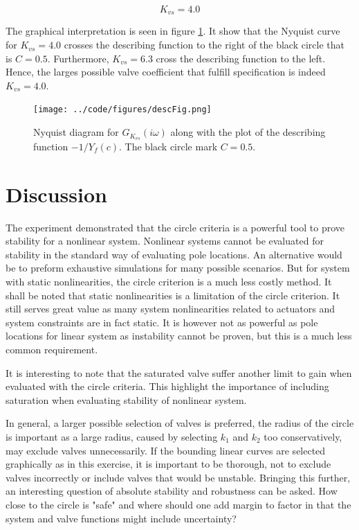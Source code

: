 \documentclass[a4paper, titlepage]{article}
\begin{document}
\begin{equation}
K_{vs} = 4.0
\label{equ:k_max}
\end{equation}

The graphical interpretation is seen in figure \ref{fig:descFunc}.
It show that the Nyquist curve for $K_{vs}=4.0$ crosses the describing function to the right of the black circle that is $C=0.5$.
Furthermore, $K_{vs}=6.3$ cross the describing function to the left.  
Hence, the larges possible valve coefficient that fulfill specification is indeed $K_{vs} = 4.0$.

\begin{figure}[H]
\center
\texttt{[image: ../code/figures/descFig.png]}
\caption{Nyquist diagram for $G_{K_{vs}}(i\omega)$ along with the plot of the describing function $-1/Y_f(c)$. The black circle mark $C = 0.5$.}
\label{fig:descFunc}
\end{figure}



\section{Discussion}

The experiment demonstrated that the circle criteria is a powerful tool to prove stability for a nonlinear system.
Nonlinear systems cannot be evaluated for stability in the standard way of evaluating pole locations.
An alternative would be to preform exhaustive simulations for many possible scenarios.
But for system with static nonlinearities, the circle criterion is a much less costly method.
It shall be noted that static nonlinearities is a limitation of the circle criterion.
It still serves great value as many system nonlinearities related to actuators and system constraints are in fact static.
It is however not as powerful as pole locations for linear system as instability cannot be proven, but this is a much less common requirement.

It is interesting to note that the saturated valve suffer another limit to gain when evaluated with the circle criteria.
This highlight the importance of including saturation when evaluating stability of nonlinear system.

In general, a larger possible selection of valves is preferred, the radius of the circle is important as a large radius, caused by selecting $k_{1}$ and $k_{2}$ too conservatively,  may exclude valves unnecessarily. 
If the bounding linear curves are selected graphically as in this exercise, it is important to be thorough, not to exclude valves incorrectly or include valves that would be unstable.
Bringing this further, an interesting question of absolute stability and robustness can be asked. 
How close to the circle is "safe" and where should one add margin to factor in that the system and valve functions might include uncertainty?
\end{document}
